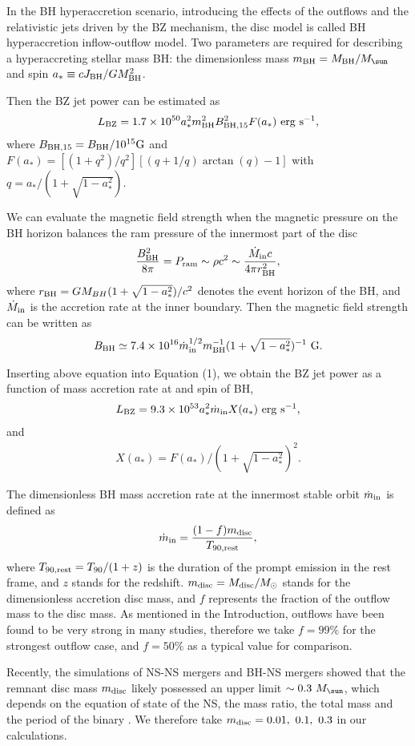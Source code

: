 \documentclass[a4paper,fleqn,usenatbib]{mnras}
\def\beq{\begin{eqnarray}}
\def\eeq{\end{eqnarray}}
\begin{document}
In the BH hyperaccretion scenario, introducing the effects of the outflows and the relativistic jets driven by the BZ mechanism, the disc model is called BH hyperaccretion inflow-outflow model. Two parameters are required for describing a hyperaccreting stellar mass BH: the dimensionless mass $m_{\rm BH}=M_{\rm BH}/M_{\rm \sun}$ and spin $a_* \equiv cJ_{\rm BH}/GM_{\rm BH}^{2}$.

Then the BZ jet power can be estimated as \citep[e.g .,][]{Lee2000a,Lee2000b,Li2000,McKinney2005,Barkov2008,Komissarov2009,Barkov2010,Lei2013}
\beq
L_{\rm BZ}=1.7\times10^{50}a_{*}^{2}m_{\rm BH}^{2}B_{\rm BH,15}^{2}F(a_*){\rm~erg~s^{-1}},
\eeq
where $B_{\rm BH,15}=B_{\rm BH}/10^{15} {\rm G}$ and $F(a_*)=[(1+q^{2})/q^{2}][(q+1/q)\arctan(q)-1]$ with $q=a_{*}/(1+\sqrt{1-a_{*}^{2}})$.

We can evaluate the magnetic field strength when the magnetic pressure on the BH horizon balances the ram pressure of the innermost part of the disc \citep[e.g.,][]{Moderski1997}
\beq
\frac{B_{\rm BH}^2}{8\pi}=P_{\rm ram}\sim \rho c^2 \sim \frac{\dot{M}_{\rm in}c}{4\pi r_{\rm BH}^2},
\eeq
where $r_{\rm BH}=GM_{BH}(1+\sqrt{1-a_*^{2}})/c^2$ denotes the event horizon of the BH, and $\dot{M}_{\rm in}$ is the accretion rate at the inner boundary. Then the magnetic field strength can be written as
\beq
B_{\rm BH} \simeq 7.4 \times 10^{16}\dot{m}_{\rm in}^{1/2}m_{\rm BH}^{-1}(1+\sqrt{1-a_{*}^{2}})^{-1}~ {\rm G}.
\eeq

Inserting above equation into Equation (1), we obtain the BZ jet power as a function of mass accretion rate at  and spin of BH,
\beq
L_{\rm BZ}=9.3\times10^{53}a_*^{2}\dot{m}_{\rm in} X(a_*){\rm~erg~s^{-1}},
\eeq
and
\beq
X(a_*)=F(a_*)/(1+\sqrt{1-a_*^{2}})^{2}.
\eeq

The dimensionless BH mass accretion rate at the innermost stable orbit $\dot{m}_{\rm in}$ is defined as
\beq
\dot{m}_{\rm in}=\frac{(1-f) m_{\rm disc}}{T_{90,\rm rest}},
\eeq
where $T_{\rm 90,\rm rest} = T_{90}/(1+z)$ is the duration of the prompt emission in the rest frame, and $z$ stands for the redshift. $m_{\rm disc}=M_{\rm disc}/M_{\odot}$ stands for the dimensionless accretion disc mass, and $f$ represents the fraction of the outflow mass to the disc mass. As mentioned in the Introduction, outflows have been found to be very strong in many studies, therefore we take $f = 99\%$ for the strongest outflow case, and $f=50\%$ as a typical value for comparison.

Recently, the simulations of NS-NS mergers \citep[e.g.,][]{Dietrich2015} and BH-NS mergers \citep[e.g.,][]{Foucart2014,Just2015,Kyutoku2015,Kiuchi2015,Siegel2017} showed that the remnant disc mass $m_{\rm disc}$ likely possessed an upper limit $\sim 0.3~M_{\rm\sun}$, which depends on the equation of state of the NS, the mass ratio, the total mass and the period of the binary \citep[e.g.,][]{Oechslin2006,Dietrich2015}. We therefore take $m_{\rm disc}=0.01, ~0.1, ~0.3$ in our calculations.
\end{document}
